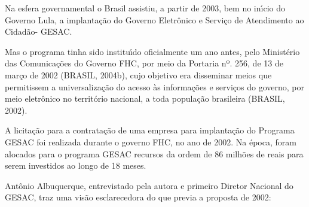 \documentclass[
12pt,		%
openright,	%
twoside,  %
a4paper,			%
chapter=TITLE,		%
english,			%
french,				%
spanish,			%
brazil				%
]{USPSC-classe/USPSC}
\begin{document}
Na esfera governamental o Brasil assistiu, a partir de 2003, bem no in\'{\i}cio do Governo Lula, a implanta\c{c}\~ao do Governo Eletr\^onico e Servi\c{c}o de Atendimento ao Cidad\~ao-  GESAC.

















Mas o programa tinha sido institu\'{\i}do oficialmente um ano antes, pelo Minist\'erio das Comunica\c{c}\~oes do Governo FHC, por meio  da Portaria nº. 256, de 13 de mar\c{c}o de 2002 (BRASIL, 2004b), cujo  objetivo era disseminar meios que permitissem a universaliza\c{c}\~ao do acesso \`as informa\c{c}\~oes e servi\c{c}os do governo, por meio eletr\^onico no territ\'orio nacional, a toda popula\c{c}\~ao brasileira (BRASIL, 2002).

















A licita\c{c}\~ao para a contrata\c{c}\~ao de uma empresa para implanta\c{c}\~ao do Programa GESAC foi realizada durante o governo FHC, no ano de 2002. Na \'epoca, foram alocados para o programa GESAC recursos da ordem de 86 milh\~oes de reais para serem investidos ao longo de 18 meses.

















Ant\^onio Albuquerque, entrevistado pela autora e primeiro Diretor Nacional do GESAC, traz uma vis\~ao esclarecedora do que previa a proposta de 2002:
\end{document}
